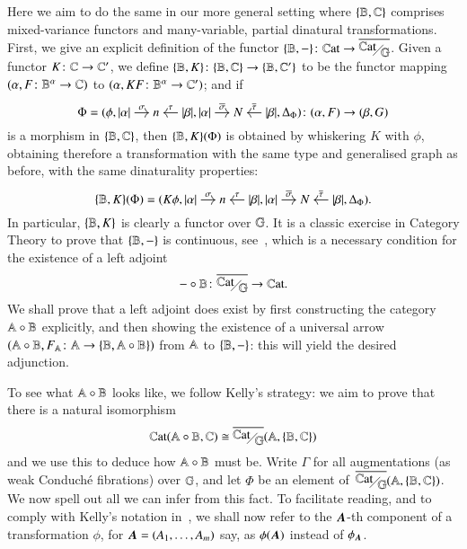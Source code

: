 Here we aim to do the same in our more general setting where $\{ \mathbb B,\mathbb C\}$ comprises mixed-variance functors and many-variable, partial dinatural transformations. First, we give an explicit definition of the functor $\FC \B - \colon \Cat \to \WCFover\gcf$. Given a functor $K \colon \mathbb C \to \mathbb C'$, we define $\{ \mathbb B,K\} \colon \{ \mathbb B,\mathbb C\} \to \{ \mathbb B,\mathbb C'\}$ to be the functor mapping $(\alpha,F \colon \mathbb B^\alpha \to \mathbb C)$ to $(\alpha,KF \colon \mathbb B^\alpha \to \mathbb C')$; and if 
\[
\Phi = (\phi,
\begin{tikzcd}[cramped,sep=small]
\length\alpha \ar[r,"\sigma"] & n & \length\beta \ar[l,"\tau"']
\end{tikzcd},
\begin{tikzcd}[cramped,sep=small]
\length\alpha \ar[r,"\overline\sigma"] & N & \length\beta \ar[l,"\overline\tau"']
\end{tikzcd},
\Delta_\Phi
)
\colon (\alpha,F) \to (\beta,G)
\]
is a morphism in $\{ \mathbb B,\mathbb C\}$, then $\{ \mathbb B,K\} (\Phi)$ is obtained by whiskering $K$ with $\phi$, obtaining therefore a transformation with the same type and generalised graph as before, with the same dinaturality properties:
\[
\FC \B K (\Phi) = (
K\phi,
\begin{tikzcd}[cramped,sep=small]
\length\alpha \ar[r,"\sigma"] & n & \length\beta \ar[l,"\tau"']
\end{tikzcd},
\begin{tikzcd}[cramped,sep=small]
\length\alpha \ar[r,"\overline\sigma"] & N & \length\beta \ar[l,"\overline\tau"']
\end{tikzcd},
\Delta_\Phi
).
\]
In particular, $\{ \mathbb B,K\}$ is clearly a functor over $\mathbb G$. It is a classic exercise in Category Theory to prove that $\{ \mathbb B,-\}$ is continuous, see~\cite[Theorem 3.52]{santamaria_towards_2019}, which is a necessary condition for the existence of a left adjoint
\[
\ring - \B \colon \WCFover\gcf \to \Cat.
\]
We shall prove that a left adjoint does exist by first constructing the category $\mathbb A \circ \mathbb B$ explicitly, and then showing the existence of a universal arrow $(\mathbb A \circ \mathbb B, F_\mathbb A \colon \mathbb A \to \{ \mathbb B,\mathbb A \circ \mathbb B\})$ from $\mathbb A$ to $\{ \mathbb B,-\}$: this will yield the desired adjunction. 

To see what $\mathbb A \circ \mathbb B$ looks like, we follow Kelly's strategy: we aim to prove that there is a natural isomorphism
\[
\Cat ( \ring \A \B, \C) \cong \WCFover\gcf (\A, \FC \B \C)
\]
and we use this to deduce how $\mathbb A \circ \mathbb B$ must be. Write $\Gamma$ for all augmentations (as weak Conduché fibrations) over $\mathbb G$, and let $\Phi$ be an element of $\,\WCFover\gcf(\A,\FC \B \C)$. We now spell out all we can infer from this fact. To facilitate reading, and to comply with Kelly's notation in~\cite{kelly_many-variable_1972}, we shall now refer to the ${\boldsymbol A}$-th component of a transformation $\phi$, for ${\boldsymbol A}=(A_1,\dots,A_m)$ say, as $\phi(\bfA)$ instead of $\phi_{\bfA}$.

